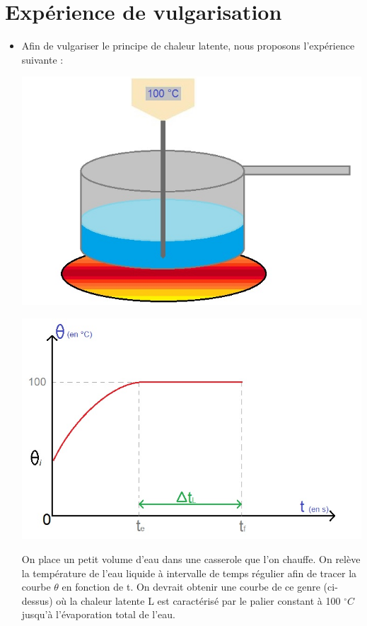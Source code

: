 \documentclass[12pt,a4paper]{article}
\begin{document}
\section{Expérience de vulgarisation}
\begin{itemize}
\item

Afin de vulgariser le principe de chaleur latente, nous proposons l'expérience suivante :\\
\begin{multicols}{2}
\includegraphics[scale=0.5]{exp2} 
\columnbreak

\includegraphics[scale=0.5]{graph1}
 \end{multicols}
 
On place un petit volume d'eau dans une casserole que l'on chauffe. On relève la température de l'eau liquide à intervalle de temps régulier afin de tracer la courbe $ \theta $ en fonction de t. On devrait obtenir une courbe de ce genre (ci-dessus) où la chaleur latente L est caractérisé par le palier constant à 100 $ ^\circ C$ jusqu'à l'évaporation total de l'eau.\\
 

\end{itemize}
\end{document}
